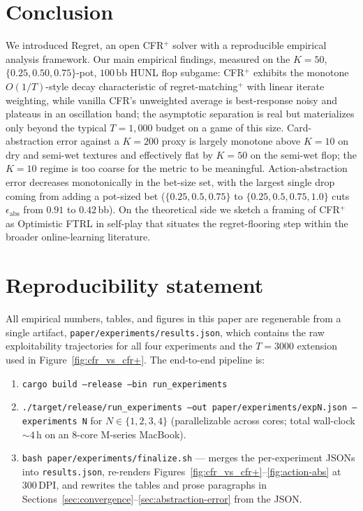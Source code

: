 \section{Conclusion}
\label{sec:conclusion}

We introduced Regret, an open CFR$^+$ solver with a reproducible empirical
analysis framework. Our main empirical findings, measured on the
$K\!=\!50$, $\{0.25,0.50,0.75\}$-pot, $100$\,bb HUNL flop subgame:
CFR$^+$ exhibits the monotone $O(1/T)$-style decay characteristic of
regret-matching$^+$ with linear iterate weighting, while vanilla CFR's
unweighted average is best-response noisy and plateaus in an
oscillation band; the asymptotic separation is real but materializes
only beyond the typical $T\!=\!1{,}000$ budget on a game of this size.
Card-abstraction error against a $K\!=\!200$ proxy is largely monotone
above $K\!=\!10$ on dry and semi-wet textures and effectively flat by
$K\!=\!50$ on the semi-wet flop; the $K\!=\!10$ regime is too coarse for
the metric to be meaningful. Action-abstraction error decreases
monotonically in the bet-size set, with the largest single drop coming
from adding a pot-sized bet ($\{0.25,0.5,0.75\}$ to
$\{0.25,0.5,0.75,1.0\}$ cuts $\epsilon_{\mathrm{abs}}$ from $0.91$ to
$0.42$\,bb). On the theoretical side we sketch a framing of CFR$^+$ as
Optimistic FTRL in self-play that situates the regret-flooring step
within the broader online-learning literature.

\section*{Reproducibility statement}
\label{sec:reproducibility}

All empirical numbers, tables, and figures in this paper are regenerable
from a single artifact, \texttt{paper/experiments/results.json}, which
contains the raw exploitability trajectories for all four experiments
and the $T\!=\!3000$ extension used in Figure~\ref{fig:cfr_vs_cfr+}. The
end-to-end pipeline is:

\begin{enumerate}
  \item \texttt{cargo build --release --bin run\_experiments}
  \item \texttt{./target/release/run\_experiments --out
        paper/experiments/expN.json --experiments N} for
        $N\!\in\!\{1,2,3,4\}$ (parallelizable across cores; total
        wall-clock $\sim\!4$\,h on an 8-core M-series MacBook).
  \item \texttt{bash paper/experiments/finalize.sh} --- merges the
        per-experiment JSONs into \texttt{results.json}, re-renders
        Figures~\ref{fig:cfr_vs_cfr+}--\ref{fig:action-abs} at
        $300$\,DPI, and rewrites the tables and prose paragraphs in
        Sections~\ref{sec:convergence}--\ref{sec:abstraction-error} from
        the JSON.
\end{enumerate}

